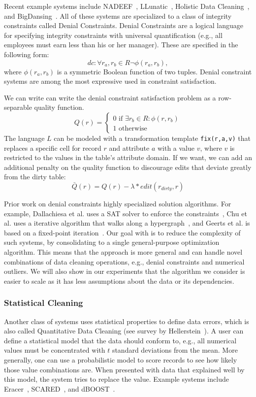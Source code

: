 Recent example systems include NADEEF~\cite{DBLP:conf/sigmod/DallachiesaEEEIOT13}, LLunatic~\cite{geerts2013llunatic}, Holistic Data Cleaning~\cite{chu2013holistic}, and BigDansing~\cite{khayyat2015bigdansing}.
All of these systems are specialized to a class of integrity constraints called Denial Constraints.
Denial Constraints are a logical language for specifying integrity constraints with universal quantification (e.g., all employees must earn less than his or her manager).
These are specified in the following form:
\[
dc: \forall r_a, r_b \in R \neg \phi(r_a, r_b),
\]
where $\phi(r_a, r_b)$ is a symmetric Boolean function of two tuples.
Denial constraint systems are among the most expressive used in constraint satisfaction.

We can write can write the denial constraint satisfaction problem as a row-separable quality function.
\[Q(r) =
\begin{cases}
0 \text{ if } \exists r_b \in R : \phi(r, r_b) \\
1 \text{ otherwise}
\end{cases}\]
The language $L$ can be modeled with a transformation template \texttt{fix(r,a,v)} that replaces a specific cell for record $r$ and attribute $a$ with a value $v$, where $v$ is restricted to the values in the table's attribute domain.
If we want, we can add an additional penalty on the quality function to discourage edits that deviate greatly from the dirty table:
\[\bar{Q}(r) = Q(r) - \lambda * edit(r_{dirty}, r)\]

Prior work on denial constraints highly specialized solution algorithms.
For example, Dallachiesa et al. uses a SAT solver to enforce the constraints~\cite{DBLP:conf/sigmod/DallachiesaEEEIOT13}, Chu et al. uses a iterative algorithm that walks along a hypergraph~\cite{chu2013holistic}, and Geerts et al. is based on a fixed-point iteration~\cite{geerts2013llunatic}.
Our goal with \sys is to reduce the complexity of such systems, by consolidating to a single general-purpose optimization algorithm.
This means that the approach is more general and can handle novel combinations of data cleaning operations, e.g., denial constraints and numerical outliers.
We will also show in our experiments that the algorithm we consider is easier to scale as it has less assumptions about the data or its dependencies.

\subsubsection{Statistical Cleaning}
Another class of systems uses statistical properties to define data errors, which is also called Quantitative Data Cleaning (see survey by Hellerstein~\cite{hellerstein2008quantitative}).
A user can define a statistical model that the data should conform to, e.g., all numerical values must be concentrated with $t$ standard deviations from the mean. 
More generally, one can use a probabilistic model to score records to see how likely those value combinations are.
When presented with data that explained well by this model, the system tries to replace the value.
Example systems include Eracer~\cite{eracer}, SCARED~\cite{yakout2013don}, and dBOOST~\cite{pit2016outlier}.

